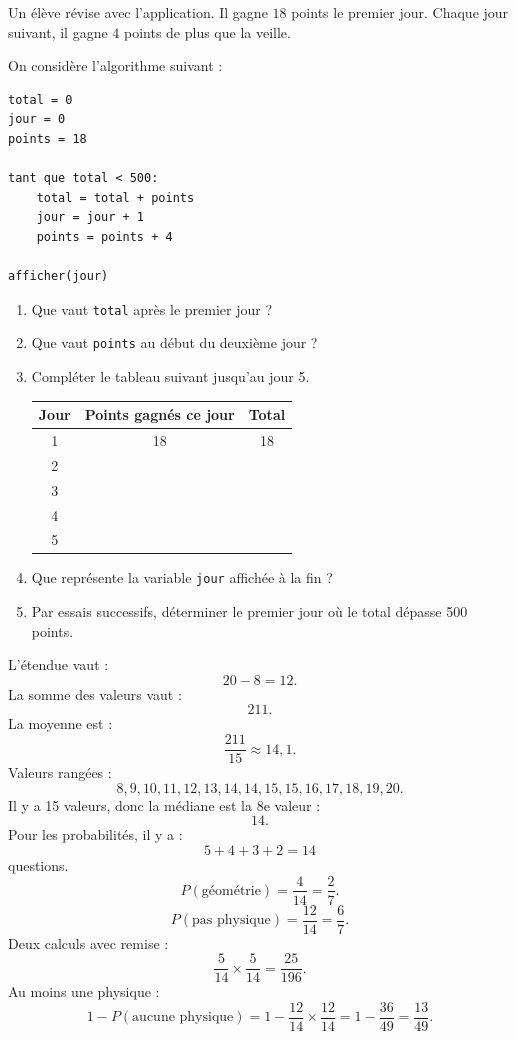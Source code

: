 \begin{exercice}
Un élève révise avec l'application. Il gagne $18$ points le premier jour. Chaque jour suivant, il gagne $4$ points de plus que la veille.

On considère l'algorithme suivant :

\begin{verbatim}
total = 0
jour = 0
points = 18

tant que total < 500:
    total = total + points
    jour = jour + 1
    points = points + 4

afficher(jour)
\end{verbatim}

\begin{enumerate}
  \item Que vaut \texttt{total} après le premier jour ?
  \item Que vaut \texttt{points} au début du deuxième jour ?
  \item Compléter le tableau suivant jusqu'au jour 5.

\begin{center}
\begin{tabular}{|c|c|c|}
\hline
Jour & Points gagnés ce jour & Total \\
\hline
1 & 18 & 18 \\
\hline
2 & & \\
\hline
3 & & \\
\hline
4 & & \\
\hline
5 & & \\
\hline
\end{tabular}
\end{center}

  \item Que représente la variable \texttt{jour} affichée à la fin ?
  \item Par essais successifs, déterminer le premier jour où le total dépasse 500 points.
\end{enumerate}
\end{exercice}

\begin{correction}
L'étendue vaut :
\[
20-8=12.
\]
La somme des valeurs vaut :
\[
211.
\]
La moyenne est :
\[
\frac{211}{15}\approx14{,}1.
\]
Valeurs rangées :
\[
8,9,10,11,12,13,14,14,15,15,16,17,18,19,20.
\]
Il y a 15 valeurs, donc la médiane est la 8e valeur :
\[
14.
\]
Pour les probabilités, il y a :
\[
5+4+3+2=14
\]
questions.
\[
P(\text{géométrie})=\frac{4}{14}=\frac27.
\]
\[
P(\text{pas physique})=\frac{12}{14}=\frac67.
\]
Deux calculs avec remise :
\[
\frac{5}{14}\times\frac{5}{14}=\frac{25}{196}.
\]
Au moins une physique :
\[
1-P(\text{aucune physique})
=
1-\frac{12}{14}\times\frac{12}{14}
=
1-\frac{36}{49}
=
\frac{13}{49}.
\]
\end{correction}


